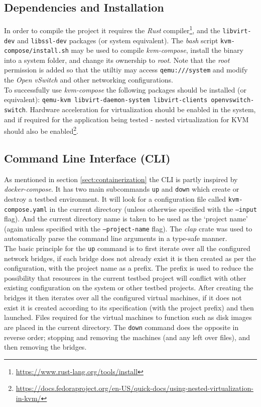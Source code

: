 \documentclass[
    author={Jacob Daniel Halsey},
    supervisor={Prof. Awais Rashid},
    degree={BSc},
    title={Building a Testbed for Evaluating Privacy Enhancing Technologies  (PETs)},
    subtitle={},
    type={software development},
    year={2021}
]{dissertation}
\begin{document}
\subsection{Dependencies and Installation}
\label{sect:dependencies}

In order to compile the project it requires the \emph{Rust} compiler\footnote{\url{https://www.rust-lang.org/tools/install}},
and the \texttt{libvirt-dev} and \texttt{libssl-dev} packages (or system equivalent).
The \emph{bash} script \texttt{kvm-compose/install.sh} may be used to compile \emph{kvm-compose},
install the binary into a system folder, and change its ownership to \emph{root}.
Note that the \emph{root} permission is added so that the utiltiy may access \texttt{qemu:///system}
and modify the \emph{Open vSwitch} and other networking configurations. \\

To successfully use \emph{kvm-compose} the following packages should be installed (or equivalent):
\texttt{qemu-kvm libvirt-daemon-system libvirt-clients openvswitch-switch}. Hardware acceleration
for virtualization should be enabled in the system, and if required for the application being tested - 
nested virtualization for KVM should also be 
enabled\footnote{\url{https://docs.fedoraproject.org/en-US/quick-docs/using-nested-virtualization-in-kvm/}}.

\subsection{Command Line Interface (CLI)}

As mentioned in section \ref{sect:containerization} the CLI is partly inspired by \emph{docker-compose}.
It has two main subcommands \texttt{up} and \texttt{down} which create or destroy a testbed environment.
It will look for a configuration file called \texttt{kvm-compose.yaml} in the current directory (unless
otherwise specified with the \texttt{--input} flag).
And the current directory name is taken to be used as the `project name' (again unless specified with
the \texttt{--project-name} flag). The \emph{clap} crate was used to automatically parse the command line arguments
in a type-safe manner. \\ 

The basic principle for the \texttt{up} command is to first iterate over all the configured network bridges,
if each bridge does not already exist it is then created as per the configuration, with the project name as a prefix.
The prefix is used to reduce the possibility that resources in the current testbed project will conflict
with other existing configuration on the system or other testbed projects. 
After creating the bridges it then iterates over all the configured virtual machines, if it does not exist
it is created according to its specification (with the project prefix) and then launched. 
Files required for the virtual machines to function such as disk images are placed in the current directory.
The \texttt{down} command does the opposite in reverse order;
stopping and removing the machines (and any left over files), and then removing the bridges. \\
\end{document}
